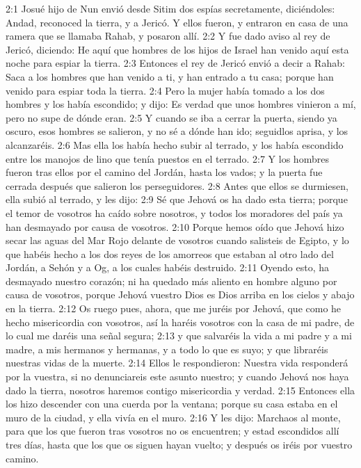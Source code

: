 2:1 Josué hijo de Nun envió desde Sitim dos espías secretamente, diciéndoles: Andad, reconoced la tierra, y a Jericó. Y ellos fueron, y entraron en casa de una ramera que se llamaba Rahab, y posaron allí.  
2:2 Y fue dado aviso al rey de Jericó, diciendo: He aquí que hombres de los hijos de Israel han venido aquí esta noche para espiar la tierra.  
2:3 Entonces el rey de Jericó envió a decir a Rahab: Saca a los hombres que han venido a ti, y han entrado a tu casa; porque han venido para espiar toda la tierra.  
2:4 Pero la mujer había tomado a los dos hombres y los había escondido; y dijo: Es verdad que unos hombres vinieron a mí, pero no supe de dónde eran.  
2:5 Y cuando se iba a cerrar la puerta, siendo ya oscuro, esos hombres se salieron, y no sé a dónde han ido; seguidlos aprisa, y los alcanzaréis.  
2:6 Mas ella los había hecho subir al terrado, y los había escondido entre los manojos de lino que tenía puestos en el terrado.  
2:7 Y los hombres fueron tras ellos por el camino del Jordán, hasta los vados; y la puerta fue cerrada después que salieron los perseguidores.  
2:8 Antes que ellos se durmiesen, ella subió al terrado, y les dijo:  
2:9 Sé que Jehová os ha dado esta tierra; porque el temor de vosotros ha caído sobre nosotros, y todos los moradores del país ya han desmayado por causa de vosotros.  
2:10 Porque hemos oído que Jehová hizo secar las aguas del Mar Rojo delante de vosotros cuando salisteis de Egipto, y lo que habéis hecho a los dos reyes de los amorreos que estaban al otro lado del Jordán, a Sehón y a Og, a los cuales habéis destruido. 
2:11 Oyendo esto, ha desmayado nuestro corazón; ni ha quedado más aliento en hombre alguno por causa de vosotros, porque Jehová vuestro Dios es Dios arriba en los cielos y abajo en la tierra.  
2:12 Os ruego pues, ahora, que me juréis por Jehová, que como he hecho misericordia con vosotros, así la haréis vosotros con la casa de mi padre, de lo cual me daréis una señal segura;  
2:13 y que salvaréis la vida a mi padre y a mi madre, a mis hermanos y hermanas, y a todo lo que es suyo; y que libraréis nuestras vidas de la muerte.  
2:14 Ellos le respondieron: Nuestra vida responderá por la vuestra, si no denunciareis este asunto nuestro; y cuando Jehová nos haya dado la tierra, nosotros haremos contigo misericordia y verdad.  
2:15 Entonces ella los hizo descender con una cuerda por la ventana; porque su casa estaba en el muro de la ciudad, y ella vivía en el muro.  
2:16 Y les dijo: Marchaos al monte, para que los que fueron tras vosotros no os encuentren; y estad escondidos allí tres días, hasta que los que os siguen hayan vuelto; y después os iréis por vuestro camino.  
